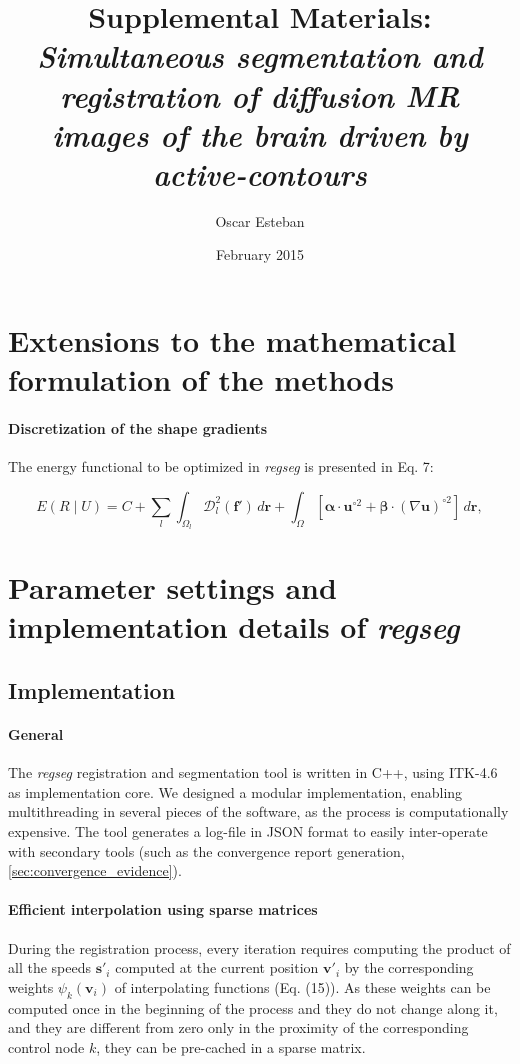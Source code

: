 \documentclass[a4paper]{report}
\providecommand{\mdist}[2]{ \mathcal{D}_{#2}^2(\mathbf{#1}) }
\renewcommand{\vec}[1]{\mathbf{#1}}
\begin{document}
\title{Supplemental Materials: \emph{Simultaneous segmentation and registration of
diffusion MR images of the brain driven by active-contours}}
\author{Oscar Esteban}
\date{February 2015}

\maketitle
\section{Extensions to the mathematical formulation of the methods}

\paragraph{Discretization of the shape gradients} The energy functional to be optimized
  in \emph{regseg} is presented in Eq. 7:

  \begin{equation}
  E(R \mid U) = C + \underset{l}{\sum} \int_{\Omega_l}
  \mdist{f'}{l} \,d\vec{r}
  + \int_{\Omega} \left[ \boldsymbol{\alpha} \cdot \vec{u}^{\circ2}
  + \boldsymbol{\beta} \cdot (\nabla \vec{u})^{\circ2} \right] \,d\vec{r},
  \label{eq:energy}
  \end{equation}



\section{Parameter settings and implementation details of \emph{regseg}}

\subsection{Implementation}
\paragraph{General} The \emph{regseg} registration and segmentation tool is written in C++, using ITK-4.6 as
  implementation core.
We designed a modular implementation, enabling multithreading in several pieces of the software,
  as the process is computationally expensive.
The tool generates a log-file in JSON format to easily inter-operate with secondary tools (such
  as the convergence report generation, \autoref{sec:convergence_evidence}).

\paragraph{Efficient interpolation using sparse matrices}
During the registration process, every iteration requires computing the product of all the speeds
  $\mathbf{s}'_i$ computed at the current position $\mathbf{v}'_i$ by the corresponding weights
  $\psi_k(\mathbf{v}_i)$ of interpolating functions (Eq. (15)).
As these weights can be computed once in the beginning of the process and they do not change along
  it, and they are different from zero only in the proximity of the corresponding control node $k$,
  they can be pre-cached in a sparse matrix.
\end{document}
